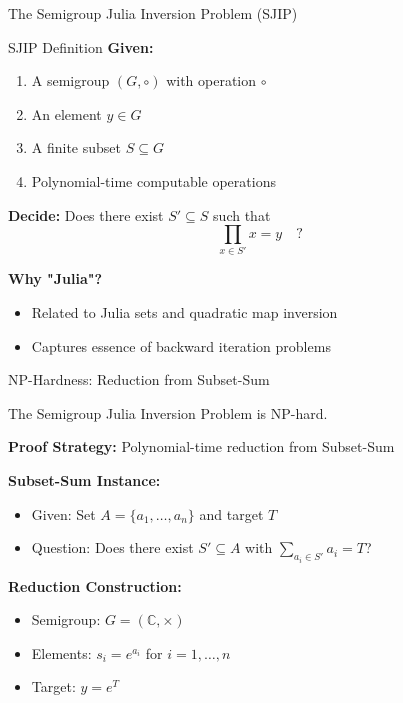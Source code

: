 \documentclass[aspectratio=169,12pt]{beamer}
\begin{document}
\begin{frame}{The Semigroup Julia Inversion Problem (SJIP)}
\begin{block}{SJIP Definition}
\textbf{Given:}
\begin{enumerate}
\item A semigroup $(G, \circ)$ with operation $\circ$
\item An element $y \in G$
\item A finite subset $S \subseteq G$
\item Polynomial-time computable operations
\end{enumerate}

\vspace{0.2cm}

\textbf{Decide:} Does there exist $S' \subseteq S$ such that
$$\prod_{x \in S'} x = y \quad ?$$
\end{block}

\vspace{0.3cm}

\textbf{Why "Julia"?}
\begin{itemize}
\item Related to Julia sets and quadratic map inversion
\item Captures essence of backward iteration problems
\end{itemize}
\end{frame}

\begin{frame}{NP-Hardness: Reduction from Subset-Sum}
\begin{theorem}
The Semigroup Julia Inversion Problem is NP-hard.
\end{theorem}

\vspace{0.3cm}

\textbf{Proof Strategy:} Polynomial-time reduction from Subset-Sum

\vspace{0.3cm}

\textbf{Subset-Sum Instance:}
\begin{itemize}
\item Given: Set $A = \{a_1, \ldots, a_n\}$ and target $T$
\item Question: Does there exist $S' \subseteq A$ with $\sum_{a_i \in S'} a_i = T$?
\end{itemize}

\vspace{0.3cm}

\textbf{Reduction Construction:}
\begin{itemize}
\item Semigroup: $G = (\mathbb{C}, \times)$
\item Elements: $s_i = e^{a_i}$ for $i = 1, \ldots, n$
\item Target: $y = e^T$
\end{itemize}
\end{frame}
\end{document}
